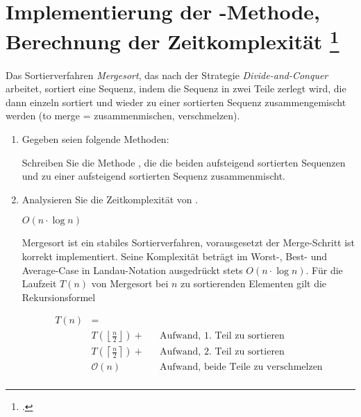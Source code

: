 \documentclass{lehramt-informatik-aufgabe}
\begin{document}

\section{Implementierung der -Methode, Berechnung der
Zeitkomplexität
\footcite[Seite 2, Aufgabe 3: Mergesort]{aud:ab:7}
}

Das Sortierverfahren \emph{Mergesort}, das nach der Strategie
\emph{Divide-and-Conquer} arbeitet, sortiert eine Sequenz, indem die
Sequenz in zwei Teile zerlegt wird, die dann einzeln sortiert und wieder
zu einer sortierten Sequenz zusammengemischt werden (to merge =
zusammenmischen, verschmelzen).

\begin{enumerate}


\item Gegeben seien folgende Methoden:


Schreiben Sie die Methode ,
die die beiden aufsteigend sortierten Sequenzen  und  zu
einer aufsteigend sortierten Sequenz zusammenmischt.

\begin{antwort}
\end{antwort}


\item Analysieren Sie die Zeitkomplexität von .

\begin{antwort}
$O(n \cdot \log n)$


Mergesort ist ein stabiles Sortierverfahren, vorausgesetzt der
Merge-Schritt ist korrekt implementiert. Seine Komplexität beträgt im
Worst-, Best- und Average-Case in Landau-Notation ausgedrückt stets $O(n
\cdot \log n)$. Für die Laufzeit $T(n)$ von Mergesort bei $n$ zu
sortierenden Elementen gilt die Rekursionsformel

\begin{align*}
T(n) & = \\
     & T\left(\left\lfloor\frac{n}{2}\right\rfloor\right) + && \text{Aufwand, 1. Teil zu sortieren}\\
     & T\left(\left\lceil\frac{n}{2}\right\rceil\right) + && \text{Aufwand, 2. Teil zu sortieren}\\
     & \mathcal{O}(n) && \text{Aufwand, beide Teile zu verschmelzen}\\
\end{align*}


\end{antwort}
\end{enumerate}
\end{document}
